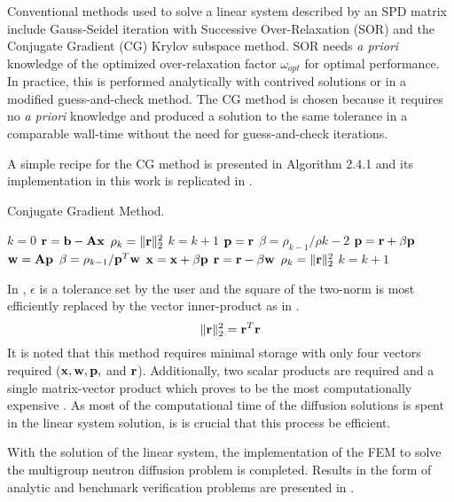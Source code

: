     Conventional methods used to solve a linear system described by an SPD
    matrix include Gauss-Seidel iteration with Successive Over-Relaxation (SOR) 
    and the Conjugate Gradient (CG) Krylov subspace method. SOR needs
    \textit{a priori} knowledge of the optimized over-relaxation factor
    $\omega_{opt}$ for optimal performance. In practice, this is performed 
    analytically with contrived solutions or in a modified guess-and-check 
    method. The CG method is chosen because it requires no 
    \textit{a priori} knowledge and produced a solution to the same tolerance in 
    a comparable wall-time without the need for guess-and-check iterations.
    
    A simple recipe for the CG method is presented in Algorithm 2.4.1
    \cite{Kelley1995IterativeEquations} and its implementation in this 
    work is replicated in .
    
    \begin{algorithm}
      \caption{Conjugate Gradient Method.}
      \label{algorithm:CG}
      \begin{algorithmic}[1]
        \State $k = 0$
        \State $\mathbf{r} = \mathbf{b} - \mathbf{A} \mathbf{x}$
        \State $\rho_k = \|\mathbf{r}\|_2^2$
        \State $k = k + 1$
            \State $\mathbf{p} = \mathbf{r}$
          \Else
            \State $\beta = \rho_{k-1} / \rho{k-2}$
            \State $\mathbf{p} = \mathbf{r} + \beta \mathbf{p}$
          \EndIf
          \State $\mathbf{w} = \mathbf{A} \mathbf{p}$
          \State $\beta = \rho_{k-1} / \mathbf{p}^{T} \mathbf{w}$
          \State $\mathbf{x} = \mathbf{x} + \beta \mathbf{p}$
          \State $\mathbf{r} = \mathbf{r} - \beta \mathbf{w}$
          \State $\rho_k = \| \mathbf{r} \|_2^2$
          \State $k=k+1$
        \EndWhile
      \end{algorithmic}
    \end{algorithm}
    
    In , $\epsilon$ is a tolerance set by the user 
    and the square of the two-norm is most efficiently replaced by the vector
    inner-product as in . 
    \begin{equation}
      \label{eq:two_norm_inner}
      \|\mathbf{r}\|_2^2 = \mathbf{r}^{T} \mathbf{r}
    \end{equation}
    It is noted that this method requires minimal storage with only four vectors 
    required ($\mathbf{x}, \mathbf{w}, \mathbf{p},$ and $\mathbf{r}$). Additionally, two scalar products 
    are required and a single matrix-vector product which proves to be the most 
    computationally expensive \cite{Kelley1995IterativeEquations}. As most of 
    the computational time of the diffusion solutions is spent in the linear 
    system solution, is is crucial that this process be efficient.

    With the solution of the linear system, the implementation of the FEM to 
    solve the multigroup neutron diffusion problem is completed. Results in the
    form of analytic and benchmark verification problems are presented in
    .
